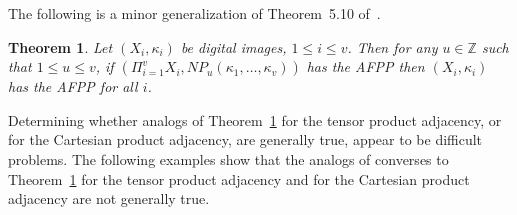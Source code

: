 \documentclass{article}
\theoremstyle{plain}
\newtheorem{thm}{Theorem}
\theoremstyle{definition}
\newtheorem{definition}[thm]{Definition}
\numberwithin{thm}{section}
\def\Z{{\mathbb Z}}
\begin{document}
\begin{comment}
A number of results concerning the AFPP were presented
in~\cite{BEKLL}, including the following.

\begin{thm}
\rm{\cite{BEKLL}}
\label{AFPP-iso}
Suppose $(X,\kappa)$ has the AFPP. Let $h : X \to Y$ be a
$(\kappa,\lambda)$-isomorphism. Then
$(Y,\lambda)$ has the AFPP. \qed
\end{thm}

\begin{thm}
\rm{\cite{BEKLL}}
\label{AFPP-ret}
Suppose $Y$ is a retract of $(X,\kappa)$. If $(X,\kappa)$
has the AFPP, then $(Y,\kappa)$ has the AFPP. \qed
\end{thm}

\begin{comment}The AFPP is related to the notion of
a {\em universal function}.

\begin{definition}
\rm{\cite{BEKLL}}
\label{univ-f}
Let $(X,\kappa)$ and $(Y,\lambda)$ be digital images.
A continuous function $f: X \to Y$ is {\em universal for}
$(X,Y)$ if for every continuous $g: X \to Y$ there exists
$x \in X$ such that $f(x)$ and $g(x)$ are equal or
$\lambda$-adjacent. \qed
\end{definition}

We have the following.

\begin{thm}
\rm{\cite{BEKLL}}
\label{AFPP-and-id}
Let $(X, \kappa )$ be a digital image. Then $(X, \kappa )$
has the AFPP if and only if the identity
function $1_X$ is universal for $(X,X)$. \qed
\end{thm}
\end{comment}

The following is a minor generalization 
of Theorem~5.10 of~\cite{BEKLL}.

\begin{thm}
\rm{\cite{Boxer16a}}
\label{NP-AFPP}
Let $(X_i,\kappa_i)$ be digital images, $1 \leq i \leq v$.
Then for any $u \in \Z$ such that
$1 \leq u \leq v$, if
$(\Pi_{i=1}^v X_i, NP_u(\kappa_1, \ldots, \kappa_v))$
has the AFPP then
$(X_i,\kappa_i)$ has the AFPP for all $i$.
\end{thm}

Determining whether
analogs of Theorem~\ref{NP-AFPP} for the
tensor product adjacency, or for the
Cartesian product adjacency, are generally
true, appear to be difficult problems.
The following examples show that the
analogs of converses to Theorem~\ref{NP-AFPP} for the
tensor product adjacency and for the
Cartesian product adjacency are not
generally true.
\end{document}
